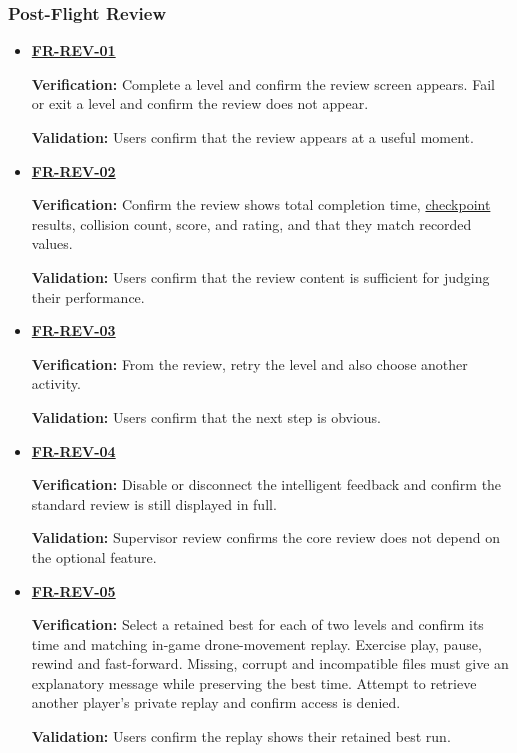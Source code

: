 \documentclass[12pt]{article}
\begin{document}
\subsubsection{Post-Flight Review}
\begin{itemize}
\item \hyperlink{req:FR-REV-01}{\textbf{FR-REV-01}}\par
 \textbf{Verification:} Complete a level and confirm the review screen
 appears. Fail or exit a level and confirm the review does not appear.\par
 \textbf{Validation:} Users confirm that the review appears at a useful moment.
\item \hyperlink{req:FR-REV-02}{\textbf{FR-REV-02}}\par
 \textbf{Verification:} Confirm the review shows total completion time,
 \hyperlink{glos:Checkpoint}{checkpoint} results, collision count, score, and rating, and that they match
 recorded values.\par
 \textbf{Validation:} Users confirm that the review content is sufficient for
 judging their performance.
\item \hyperlink{req:FR-REV-03}{\textbf{FR-REV-03}}\par
 \textbf{Verification:} From the review, retry the level and also choose
 another activity.\par
 \textbf{Validation:} Users confirm that the next step is obvious.
\item \hyperlink{req:FR-REV-04}{\textbf{FR-REV-04}}\par
 \textbf{Verification:} Disable or disconnect the intelligent feedback and
 confirm the standard review is still displayed in full.\par
 \textbf{Validation:} Supervisor review confirms the core review does not depend
 on the optional feature.
\item \hyperlink{req:FR-REV-05}{\textbf{FR-REV-05}}\par\nopagebreak[4]
 \textbf{Verification:} Select a retained best for each of two levels and
 confirm its time and matching in-game drone-movement replay. Exercise play,
 pause, rewind and fast-forward. Missing, corrupt and incompatible files
 must give an explanatory message while preserving the best time. Attempt
 to retrieve another player's private replay and confirm access is denied.\par
 \textbf{Validation:} Users confirm the replay shows their retained best run.
\end{itemize}
\end{document}
